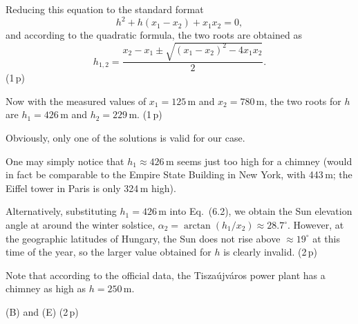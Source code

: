 \begin{description}
  Reducing this equation to the standard format
  \[
    h^2 + h(x_1 - x_2) + x_1 x_2 = 0, \tag{6.6}
  \]
  and according to the quadratic formula, the two roots are obtained as
  \[
    h_{1,2} = \frac{x_2 - x_1 \pm \sqrt{(x_1 - x_2)^2 - 4x_1x_2}}{2}. \tag{6.7}
  \]
  \hfill(1\,p)

  Now with the measured values of $x_1 = 125$\,m and $x_2 = 780$\,m, the two
  roots for $h$ are $h_1 = 426$\,m and $h_2 = 229$\,m. \hfill(1\,p)

  Obviously, only one of the solutions is valid for our case.

  One may simply notice that $h_1 \approx 426$\,m seems just too high for a
  chimney (would in fact be comparable to the Empire State Building in New
  York, with 443\,m; the Eiffel tower in Paris is only 324\,m high).

  Alternatively, substituting $h_1 = 426$\,m into Eq.~(6.2), we obtain the Sun
  elevation angle at around the winter solstice,
  $\alpha_2 = \arctan(h_1/x_2) \approx 28.7^\circ$. However, at the geographic
  latitudes of Hungary, the Sun does not rise above ${\approx}19^\circ$ at this
  time of the year, so the larger value obtained for $h$ is clearly invalid.
  \hfill(2\,p)

  Note that according to the official data, the Tiszaújváros power plant has a
  chimney as high as $h = 250$\,m.

\item[d)] (B) and (E) \hfill(2\,p)
\end{description}

